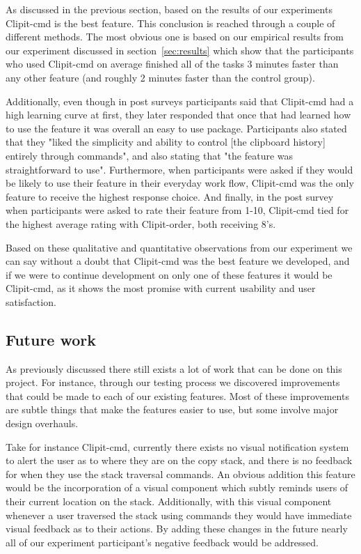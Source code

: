 \documentclass{acm_proc_article-sp}
\begin{document}
As discussed in the previous section, based on the results of our experiments Clipit-cmd is the best feature. This conclusion is reached through a couple of different methods. The most obvious one is based on our empirical results from our experiment discussed in section~\ref{sec:results} which show that the participants who used Clipit-cmd on average finished all of the tasks 3 minutes faster than any other feature (and roughly 2 minutes faster than the control group).

Additionally, even though in post surveys participants said that Clipit-cmd had a high learning curve at first, they later responded that once that had learned how to use the feature it was overall an easy to use package. Participants also stated that they "liked the simplicity and ability to control [the clipboard history] entirely through commands", and also stating that "the feature was straightforward to use". Furthermore, when participants were asked if they would be likely to use their feature in their everyday work flow, Clipit-cmd was the only feature to receive the highest response choice. And finally, in the post survey when participants were asked to rate their feature from 1-10, Clipit-cmd tied for the highest average rating with Clipit-order, both receiving 8's.

Based on these qualitative and quantitative observations from our experiment we can say without a doubt that Clipit-cmd was the best feature we developed, and if we were to continue development on only one of these features it would be Clipit-cmd, as it shows the most promise with current usability and user satisfaction.

\subsection{Future work}\label{sec:future}

As previously discussed there still exists a lot of work that can be done on this project. For instance, through our testing process we discovered improvements that could be made to each of our existing features. Most of these improvements are subtle things that make the features easier to use, but some involve major design overhauls. 

Take for instance Clipit-cmd, currently there exists no visual notification system to alert the user as to where they are on the copy stack, and there is no feedback for when they use the stack traversal commands. An obvious addition this feature would be the incorporation of a visual component which subtly reminds users of their current location on the stack. Additionally, with this visual component whenever a user traversed the stack using commands they would have immediate visual feedback as to their actions. By adding these changes in the future nearly all of our experiment participant's negative feedback would be addressed.
\end{document}
